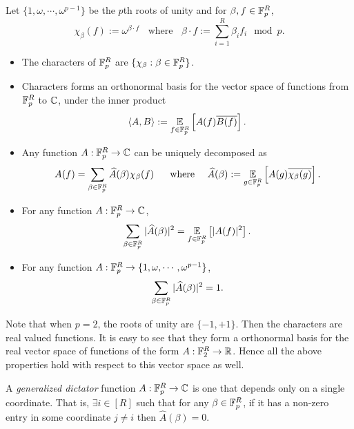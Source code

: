 \begin{observation} \label{lem:fourier} 
Let $\{1,\omega,\cdots,\omega^{p-1}\}$ be the
$p$th roots of unity and for $\beta,f \in \mathbb F_p^R$, 
$$\chi_\beta(f) := \omega^{ \beta \cdot f } ~~~~\text{where}~~~~ \beta \cdot f := \sum_{i=1}^R \beta_i f_i \mod p.$$ 
\begin{itemize} 
\item The characters of $\mathbb F_p^R$ are $\{ \chi_\beta : \beta \in \mathbb F_p^R\}$. 
\item Characters forms an orthonormal basis for the vector space of 
functions from $\mathbb F_p^R$ to $\mathbb C$, under the inner product 
$$\langle A, B\rangle := \operatorname*{\mathbb E}_{f \in \mathbb F_p^R}\left[A(f)\overline{B(f)}\right].$$ 
\item Any function $A:\mathbb F_p^R \rightarrow \mathbb C$
can be uniquely decomposed as 
$$A(f) = \sum_{\beta \in \mathbb F_p^R}\widehat{A}(\beta) \chi_\beta(f)~~~~\text{
where} ~~~~\widehat{A}(\beta) := \operatorname*{\mathbb E}_{g \in \mathbb F_p^R} \left[A(g) 
\overline{\chi_\beta(g)}\right].$$ 
\item For any function $A:\mathbb F_p^R \rightarrow\mathbb C$, 
\begin{equation}
\label{eqn:parseval}
\sum_{\beta \in \mathbb F_p^R} |\widehat A(\beta)|^2 = \operatorname*{\mathbb E}_{f\in \mathbb F_p^R} \left[|A(f)|^2\right].
\end{equation}
\item For any function $A:\mathbb F_p^R\rightarrow \{1,\omega,\cdots,\omega^{p-1}\}$, 
\begin{equation}
\label{eqn:plancheral}
\sum_{\beta\in \mathbb F_p^R}|\widehat A(\beta)|^2 =1.
\end{equation}
\end{itemize} 
\end{observation}

\begin{remark}
\label{rem:char-f2}
Note that when $p=2$, the roots of unity are $\{-1,+1\}$. Then the characters
are real valued functions. It is easy to see that they form a orthonormal
basis for the real vector space of functions of the form $A:\mathbb F_2^R \rightarrow
\mathbb R$. Hence all the above properties hold with respect to this vector space
as well.
\end{remark}

\begin{definition} A \emph{generalized dictator} function 
$A:\mathbb F_p^R \rightarrow
\mathbb C$ is one that depends only on a single coordinate. That is, $\exists i \in
[R]$ such that for any $\beta \in \mathbb F_p^R$, if it has a non-zero entry in some
 coordinate $j\neq i$ then $\widehat A(\beta) = 0$. 
\end{definition}

